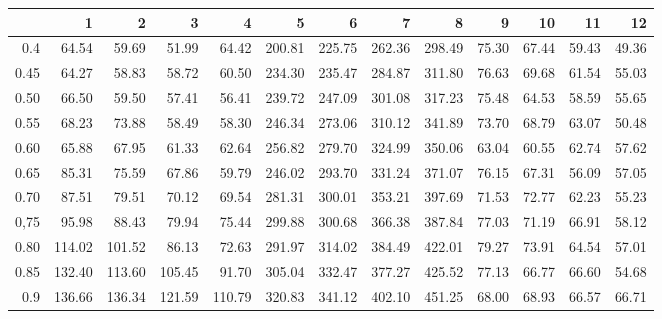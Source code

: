 \begin{table}[ht]
\centering
\begin{tabular}{rrrrrrrrrrrrr}
  \hline
 & 1 & 2 & 3 & 4 & 5 & 6 & 7 & 8 & 9 & 10 & 11 & 12 \\ 
  \hline
0.4 & 64.54 & 59.69 & 51.99 & 64.42 & 200.81 & 225.75 & 262.36 & 298.49 & 75.30 & 67.44 & 59.43 & 49.36 \\ 
  0.45 & 64.27 & 58.83 & 58.72 & 60.50 & 234.30 & 235.47 & 284.87 & 311.80 & 76.63 & 69.68 & 61.54 & 55.03 \\ 
  0.50 & 66.50 & 59.50 & 57.41 & 56.41 & 239.72 & 247.09 & 301.08 & 317.23 & 75.48 & 64.53 & 58.59 & 55.65 \\ 
  0.55 & 68.23 & 73.88 & 58.49 & 58.30 & 246.34 & 273.06 & 310.12 & 341.89 & 73.70 & 68.79 & 63.07 & 50.48 \\ 
  0.60 & 65.88 & 67.95 & 61.33 & 62.64 & 256.82 & 279.70 & 324.99 & 350.06 & 63.04 & 60.55 & 62.74 & 57.62 \\ 
  0.65 & 85.31 & 75.59 & 67.86 & 59.79 & 246.02 & 293.70 & 331.24 & 371.07 & 76.15 & 67.31 & 56.09 & 57.05 \\ 
  0.70 & 87.51 & 79.51 & 70.12 & 69.54 & 281.31 & 300.01 & 353.21 & 397.69 & 71.53 & 72.77 & 62.23 & 55.23 \\ 
  0,75 & 95.98 & 88.43 & 79.94 & 75.44 & 299.88 & 300.68 & 366.38 & 387.84 & 77.03 & 71.19 & 66.91 & 58.12 \\ 
  0.80 & 114.02 & 101.52 & 86.13 & 72.63 & 291.97 & 314.02 & 384.49 & 422.01 & 79.27 & 73.91 & 64.54 & 57.01 \\ 
  0.85 & 132.40 & 113.60 & 105.45 & 91.70 & 305.04 & 332.47 & 377.27 & 425.52 & 77.13 & 66.77 & 66.60 & 54.68 \\ 
  0.9 & 136.66 & 136.34 & 121.59 & 110.79 & 320.83 & 341.12 & 402.10 & 451.25 & 68.00 & 68.93 & 66.57 & 66.71 \\ 
   \hline
\end{tabular}
\end{table}
